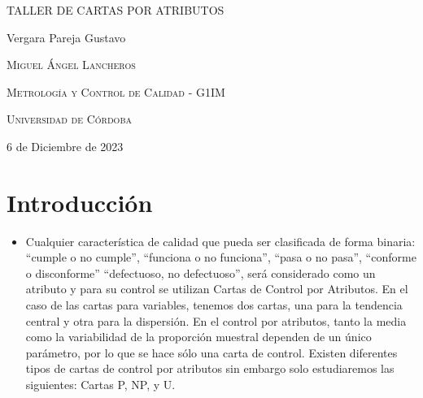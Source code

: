 \documentclass{article}
\author{Gustavo Vergara}
\theoremstyle{mytheoremstyle}
\theoremstyle{mytheoremstyle}
\theoremstyle{myproblemstyle}
\begin{document}
\pgfplotsset{compat=1.18}

\begin{titlepage}
	\centering
	\vspace{2.5cm}
	{\scshape \Large TALLER DE CARTAS POR ATRIBUTOS\par}
	\vspace{5cm}
	\textbf\large\scshape{\par}
	\vspace{0.5cm}
	{\Large Vergara Pareja Gustavo\par}
	\vspace{5cm}
	{\scshape\Large Miguel Ángel Lancheros\par}
	\vspace{0.3cm}
	{\scshape\Large Metrología y Control de Calidad - G1IM \par}
	\vspace{0.3cm}
	{\scshape\Large Universidad de Córdoba\par}
	\vspace{0.3cm}
	{\Large 6 de Diciembre de 2023 \par}
\end{titlepage}
\tableofcontents
\newpage
\section{Introducción}
\begin{itemize}
	\item Cualquier característica de calidad que pueda ser clasificada de forma binaria: “cumple o no
	cumple”, “funciona o no funciona”, “pasa o no pasa”, “conforme o disconforme” “defectuoso,
	no defectuoso”, será considerado como un atributo y para su control se utilizan Cartas de Control por Atributos.
	En el caso de las cartas para variables, tenemos dos cartas, una para la tendencia central y otra
	para la dispersión. En el control por atributos, tanto la media como la variabilidad de la
	proporción muestral dependen de un único parámetro, por lo que se hace sólo una carta de control.
	Existen diferentes tipos de cartas de control por atributos sin embargo solo estudiaremos las
	siguientes: Cartas P, NP, y U.
\end{itemize}
\end{document}
